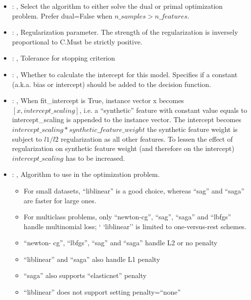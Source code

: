\begin{itemize}
    \item {}: ,
      Select the algorithm to either solve the dual or primal optimization problem.
      Prefer dual=False when $n\_samples > n\_features$.

    \item {}: ,
      Regularization parameter. The strength of the regularization is inversely
      proportional to C.Must be strictly positive.

    \item {}: ,
      Tolerance for stopping criterion

    \item {}: ,
      Whether to calculate the intercept for this model. Specifies if a constant (a.k.a. bias or
      intercept) should be added to the decision function.

    \item {}: ,
      When fit\_intercept is True, instance vector x becomes $[x, intercept\_scaling]$,
      i.e. a “synthetic” feature with constant value equals to intercept\_scaling is appended
      to the instance vector. The intercept becomes $intercept\_scaling * synthetic\_feature\_weight$
      \nb the synthetic feature weight is subject to $l1/l2$ regularization as all other features.
      To lessen the effect of regularization on synthetic feature weight (and therefore on the
      intercept)                                                  $intercept\_scaling$ has to be
      increased.

    \item {}: ,
      Algorithm to use in the optimization problem.
      \begin{itemize}                                                    \item For small datasets,
      ``liblinear'' is a good choice, whereas ``sag'' and ``saga'' are faster for large ones.
      \item For multiclass problems, only ``newton-cg'', ``sag'', ``saga'' and ``lbfgs'' handle
      multinomial loss; `                                                    `liblinear'' is limited
      to one-versus-rest schemes.                                                    \item ``newton-
      cg'', ``lbfgs'', ``sag'' and ``saga'' handle L2 or no penalty
      \item ``liblinear'' and ``saga'' also handle L1 penalty
      \item ``saga'' also supports ``elasticnet'' penalty
      \item ``liblinear'' does not support setting penalty=``none''
      \end{itemize}


\end{itemize}
